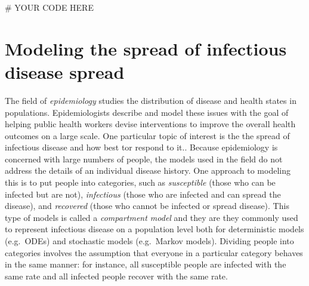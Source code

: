 \documentclass[
  letterpaper,
  DIV=11,
  numbers=noendperiod]{scrreprt}
\newenvironment{Shaded}{\begin{snugshade}}{\end{snugshade}}
\newcommand{\CommentTok}[1]{\textcolor[rgb]{0.37,0.37,0.37}{#1}}
\begin{document}
\begin{Shaded}
\begin{Highlighting}[]
\CommentTok{\# YOUR CODE HERE}
\end{Highlighting}
\end{Shaded}

\hypertarget{modeling-the-spread-of-infectious-disease-spread}{%
\section{Modeling the spread of infectious disease
spread}\label{modeling-the-spread-of-infectious-disease-spread}}

\label{sec:bio16}

The field of \emph{epidemiology} studies the distribution of disease and
health states in populations. Epidemiologists describe and model these
issues with the goal of helping public health workers devise
interventions to improve the overall health outcomes on a large scale.
One particular topic of interest is the the spread of infectious disease
and how best tor respond to it.. Because epidemiology is concerned with
large numbers of people, the models used in the field do not address the
details of an individual disease history. One approach to modeling this
is to put people into categories, such as \emph{susceptible} (those who
can be infected but are not), \emph{infectious} (those who are infected
and can spread the disease), and \emph{recovered} (those who cannot be
infected or spread disease). This type of models is called a
 \emph{compartment model} and they are
they commonly used to represent infectious disease on a population level
both for deterministic models (e.g.~ODEs) and stochastic models
(e.g.~Markov models). Dividing people into categories involves the
assumption that everyone in a particular category behaves in the same
manner: for instance, all susceptible people are infected with the same
rate and all infected people recover with the same rate.
\end{document}
